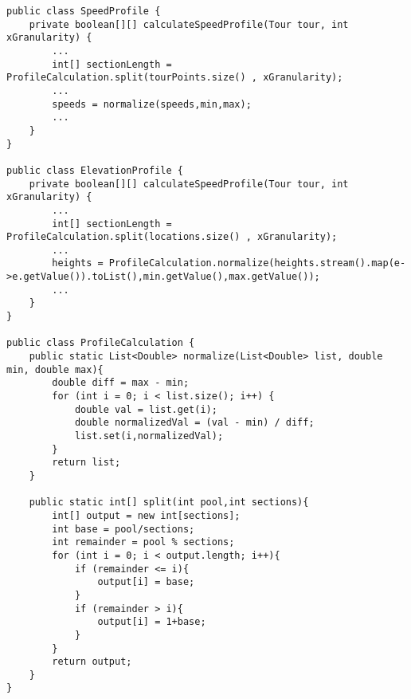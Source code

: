 \begin{lstlisting}
public class SpeedProfile {
	private boolean[][] calculateSpeedProfile(Tour tour, int xGranularity) {
		...
		int[] sectionLength = ProfileCalculation.split(tourPoints.size() , xGranularity);
		...
		speeds = normalize(speeds,min,max);
		...
	}
}

public class ElevationProfile {
	private boolean[][] calculateSpeedProfile(Tour tour, int xGranularity) {
		...
		int[] sectionLength = ProfileCalculation.split(locations.size() , xGranularity);
		...
		heights = ProfileCalculation.normalize(heights.stream().map(e->e.getValue()).toList(),min.getValue(),max.getValue());
		...
	}
}

public class ProfileCalculation {
    public static List<Double> normalize(List<Double> list, double min, double max){
        double diff = max - min;
        for (int i = 0; i < list.size(); i++) {
            double val = list.get(i);
            double normalizedVal = (val - min) / diff;
            list.set(i,normalizedVal);
        }
        return list;
    }

    public static int[] split(int pool,int sections){
        int[] output = new int[sections];
        int base = pool/sections;
        int remainder = pool % sections;
        for (int i = 0; i < output.length; i++){
            if (remainder <= i){
                output[i] = base;
            }
            if (remainder > i){
                output[i] = 1+base;
            }
        }
        return output;
    }
}
 

\end{lstlisting}